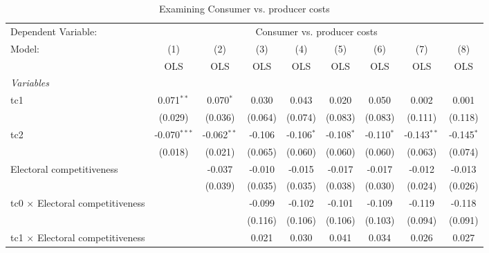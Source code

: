 
\begin{table}[htbp]
   \caption{Examining Consumer vs. producer costs}
   \centering
   \begin{tabular}{lcccccccc}
      \toprule
      Dependent Variable: & \multicolumn{8}{c}{Consumer vs. producer costs}\\
      Model:                                  & (1)            & (2)           & (3)     & (4)          & (5)          & (6)          & (7)           & (8)\\  
                                              &  OLS           & OLS           & OLS     & OLS          & OLS          & OLS          & OLS           & OLS\\  
      \midrule
      \emph{Variables}\\
      tc1                                     & 0.071$^{**}$   & 0.070$^{*}$   & 0.030   & 0.043        & 0.020        & 0.050        & 0.002         & 0.001\\   
                                              & (0.029)        & (0.036)       & (0.064) & (0.074)      & (0.083)      & (0.083)      & (0.111)       & (0.118)\\   
      tc2                                     & -0.070$^{***}$ & -0.062$^{**}$ & -0.106  & -0.106$^{*}$ & -0.108$^{*}$ & -0.110$^{*}$ & -0.143$^{**}$ & -0.145$^{*}$\\   
                                              & (0.018)        & (0.021)       & (0.065) & (0.060)      & (0.060)      & (0.060)      & (0.063)       & (0.074)\\   
      Electoral competitiveness               &                & -0.037        & -0.010  & -0.015       & -0.017       & -0.017       & -0.012        & -0.013\\   
                                              &                & (0.039)       & (0.035) & (0.035)      & (0.038)      & (0.030)      & (0.024)       & (0.026)\\   
      tc0 $\times$ Electoral competitiveness  &                &               & -0.099  & -0.102       & -0.101       & -0.109       & -0.119        & -0.118\\   
                                              &                &               & (0.116) & (0.106)      & (0.106)      & (0.103)      & (0.094)       & (0.091)\\   
      tc1 $\times$ Electoral competitiveness  &                &               & 0.021   & 0.030        & 0.041        & 0.034        & 0.026         & 0.027\\   

\end{tabular}
\end{table}
